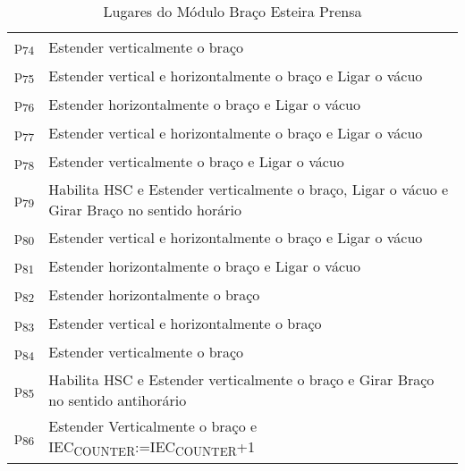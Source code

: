 \begin{table}[htbp]
\caption{Lugares do Módulo Braço Esteira Prensa}
\centering
\begin{tabular}{ll}
p\textsubscript{74} & Estender verticalmente o braço\\
p\textsubscript{75} & Estender vertical e horizontalmente o braço e Ligar o vácuo\\
p\textsubscript{76} & Estender horizontalmente o braço e Ligar o vácuo\\
p\textsubscript{77} & Estender vertical e horizontalmente o braço e Ligar o vácuo\\
p\textsubscript{78} & Estender verticalmente o braço e Ligar o vácuo\\
p\textsubscript{79} & Habilita HSC e Estender verticalmente o braço, Ligar o vácuo e Girar Braço no sentido horário\\
p\textsubscript{80} & Estender vertical e horizontalmente o braço e Ligar o vácuo\\
p\textsubscript{81} & Estender horizontalmente o braço e Ligar o vácuo\\
p\textsubscript{82} & Estender horizontalmente o braço\\
p\textsubscript{83} & Estender vertical e horizontalmente o braço\\
p\textsubscript{84} & Estender verticalmente o braço\\
p\textsubscript{85} & Habilita HSC e Estender verticalmente o braço e Girar Braço no sentido antihorário\\
p\textsubscript{86} & Estender Verticalmente o braço e IEC\textsubscript{COUNTER}:=IEC\textsubscript{COUNTER}+1\\
\end{tabular}
\end{table}

